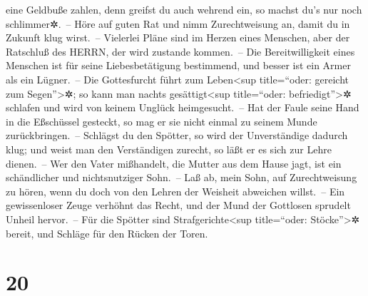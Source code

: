 eine Geldbuße zahlen, denn greifst du auch wehrend ein, so machst du's
nur noch schlimmer✲.~-- Höre auf guten Rat und nimm
Zurechtweisung an, damit du in Zukunft klug wirst.~--
Vielerlei Pläne sind im Herzen eines Menschen, aber der
Ratschluß des HERRN, der wird zustande kommen.~-- Die
Bereitwilligkeit eines Menschen ist für seine Liebesbetätigung
bestimmend, und besser ist ein Armer als ein Lügner.~--
Die Gottesfurcht führt zum Leben\textless sup
title=``oder: gereicht zum Segen''\textgreater✲; so kann man nachts
gesättigt\textless sup title=``oder: befriedigt''\textgreater✲ schlafen
und wird von keinem Unglück heimgesucht.~-- Hat der Faule
seine Hand in die Eßschüssel gesteckt, so mag er sie nicht einmal zu
seinem Munde zurückbringen.~-- Schlägst du den Spötter,
so wird der Unverständige dadurch klug; und weist man den Verständigen
zurecht, so läßt er es sich zur Lehre dienen.~-- Wer den
Vater mißhandelt, die Mutter aus dem Hause jagt, ist ein schändlicher
und nichtsnutziger Sohn.~-- Laß ab, mein Sohn, auf
Zurechtweisung zu hören, wenn du doch von den Lehren der Weisheit
abweichen willst.~-- Ein gewissenloser Zeuge verhöhnt das
Recht, und der Mund der Gottlosen sprudelt Unheil hervor.~--
Für die Spötter sind Strafgerichte\textless sup
title=``oder: Stöcke''\textgreater✲ bereit, und Schläge für den Rücken
der Toren.

\hypertarget{section-19}{%
\section{20}\label{section-19}}

